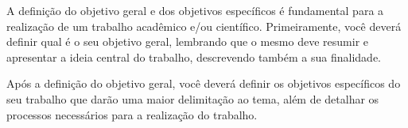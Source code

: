 A definição do objetivo geral e dos objetivos específicos é fundamental para a realização de um trabalho acadêmico e/ou científico. Primeiramente, você deverá definir qual é o seu objetivo geral, lembrando que o mesmo deve resumir e apresentar a ideia central do trabalho, descrevendo também a sua finalidade.

Após a definição do objetivo geral, você deverá definir os objetivos específicos do seu trabalho que darão uma maior delimitação ao tema, além de detalhar os processos necessários para a realização do trabalho.
